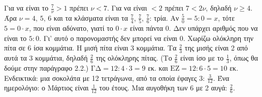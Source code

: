  Για να είναι το $\frac{7}{\nu}>1$ πρέπει $\nu<7$. Για να είναι $<2$ πρέπει $7<2\nu$, δηλαδή $\nu\geq 4$. Άρα $\nu=4,\,5,\,6$ και τα κλάσματα είναι τα $\frac{7}{4}$, $\frac{7}{5}$, $\frac{7}{6}$: τρία.
 Αν $\frac{5}{0}=5:0=x$, τότε $5=0\cdot x$, που είναι αδύνατο, γιατί το $0\cdot x$ είναι πάντα 0. Δεν υπάρχει αριθμός που να είναι το $5:0$. Γι' αυτό ο παρονομαστής δεν μπορεί να είναι 0.
 Χωρίζω ολόκληρη την πίτα σε 6 ίσα κομμάτια. Η μισή πίτα είναι 3 κομμάτια. Τα $\frac{2}{3}$ της μισής είναι 2 από αυτά τα 3 κομμάτια, δηλαδή $\frac{2}{6}$ της ολόκληρης πίτας. (Το $\frac{2}{6}$ είναι ίσο με το $\frac{1}{3}$, όπως θα δούμε στην παράγραφο 2.2.)
 $\mathrm{ΓΔ}=12:4\cdot 3=9$ εκ. και $\mathrm{ΕΖ}=12:6\cdot 5=10$ εκ.
 Ενδεικτικά: μια σοκολάτα με 12 τετράγωνα, από τα οποία έφαγες 3: $\frac{3}{12}$. Ένα ημερολόγιο: ο Μάρτιος είναι $\frac{1}{12}$ του έτους. Μια αυγοθήκη των 6 με 2 αυγά: $\frac{2}{6}$.
